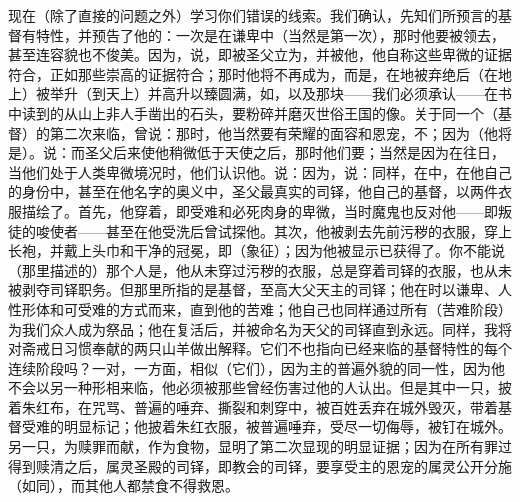 现在（除了直接的问题之外）学习你们错误的线索。我们确认，先知们所预言的基督有特性，并预告了他的：一次是在谦卑中（当然是第一次），那时他要被领去，甚至连容貌也不俊美。因为，说，即被圣父立为，并被他，他自称这些卑微的证据符合，正如那些崇高的证据符合；那时他将不再成为，而是，在地被弃绝后（在地上）被举升（到天上）并高升以臻圆满，如，以及那块——我们必须承认——在书中读到的从山上非人手凿出的石头，要粉碎并磨灭世俗王国的像。关于同一个（基督）的第二次来临，曾说：那时，他当然要有荣耀的面容和恩宠，不；因为（他将是）。说：而圣父后来使他稍微低于天使之后，那时他们要；当然是因为在往日，当他们处于人类卑微境况时，他们认识他。说：因为，说：同样，在中，在他自己的身份中，甚至在他名字的奥义中，圣父最真实的司铎，他自己的基督，以两件衣服描绘了。首先，他穿着，即受难和必死肉身的卑微，当时魔鬼也反对他——即叛徒的唆使者——甚至在他受洗后曾试探他。其次，他被剥去先前污秽的衣服，穿上长袍，并戴上头巾和干净的冠冕，即（象征）；因为他被显示已获得了。你不能说（那里描述的）那个人是，他从未穿过污秽的衣服，总是穿着司铎的衣服，也从未被剥夺司铎职务。但那里所指的是基督，至高大父天主的司铎；他在时以谦卑、人性形体和可受难的方式而来，直到他的苦难；他自己也同样通过所有（苦难阶段）为我们众人成为祭品；他在复活后，并被命名为天父的司铎直到永远。同样，我将对斋戒日习惯奉献的两只山羊做出解释。它们不也指向已经来临的基督特性的每个连续阶段吗？一对，一方面，相似（它们），因为主的普遍外貌的同一性，因为他不会以另一种形相来临，他必须被那些曾经伤害过他的人认出。但是其中一只，披着朱红布，在咒骂、普遍的唾弃、撕裂和刺穿中，被百姓丢弃在城外毁灭，带着基督受难的明显标记；他披着朱红衣服，被普遍唾弃，受尽一切侮辱，被钉在城外。另一只，为赎罪而献，作为食物，显明了第二次显现的明显证据；因为在所有罪过得到赎清之后，属灵圣殿的司铎，即教会的司铎，要享受主的恩宠的属灵公开分施（如同），而其他人都禁食不得救恩。\par

